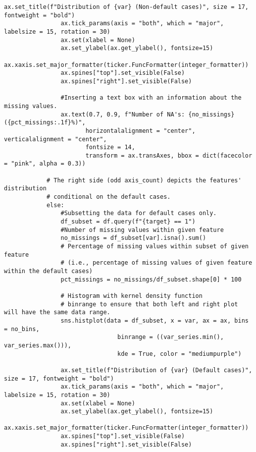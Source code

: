 \begin{lstlisting}[basicstyle=\footnotesize\ttfamily]
                ax.set_title(f"Distribution of {var} (Non-default cases)", size = 17, fontweight = "bold")
                ax.tick_params(axis = "both", which = "major", labelsize = 15, rotation = 30)
                ax.set(xlabel = None)
                ax.set_ylabel(ax.get_ylabel(), fontsize=15)
                ax.xaxis.set_major_formatter(ticker.FuncFormatter(integer_formatter))
                ax.spines["top"].set_visible(False)
                ax.spines["right"].set_visible(False)

                #Inserting a text box with an information about the missing values.
                ax.text(0.7, 0.9, f"Number of NA's: {no_missings} ({pct_missings:.1f}%)",
                       horizontalalignment = "center", verticalalignment = "center",
                       fontsize = 14,
                       transform = ax.transAxes, bbox = dict(facecolor = "pink", alpha = 0.3))

            # The right side (odd axis_count) depicts the features' distribution
            # conditional on the default cases.
            else:
                #Subsetting the data for default cases only.
                df_subset = df.query(f"{target} == 1")
                #Number of missing values within given feature
                no_missings = df_subset[var].isna().sum()
                # Percentage of missing values within subset of given feature
                # (i.e., percentage of missing values of given feature within the default cases)
                pct_missings = no_missings/df_subset.shape[0] * 100

                # Histogram with kernel density function
                # binrange to ensure that both left and right plot will have the same data range.
                sns.histplot(data = df_subset, x = var, ax = ax, bins = no_bins,
                                binrange = ((var_series.min(), var_series.max())),
                                kde = True, color = "mediumpurple")
                
                ax.set_title(f"Distribution of {var} (Default cases)", size = 17, fontweight = "bold")
                ax.tick_params(axis = "both", which = "major", labelsize = 15, rotation = 30)
                ax.set(xlabel = None)
                ax.set_ylabel(ax.get_ylabel(), fontsize=15)
                ax.xaxis.set_major_formatter(ticker.FuncFormatter(integer_formatter))
                ax.spines["top"].set_visible(False)
                ax.spines["right"].set_visible(False)


\end{lstlisting}
